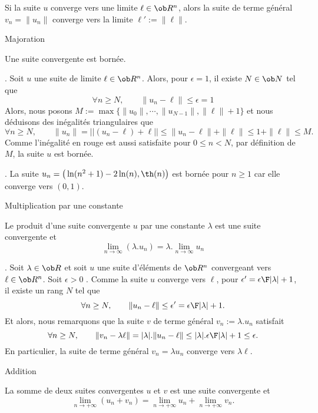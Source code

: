 Si la suite $u$ converge vers une limite $\ell\in\ob R^n$, alors la suite de terme g\'en\'eral $v_n=\|u_n\|$ converge vers la limite $\ell':=\|\ell\|$. 


\Concept [Index=Suites!limites!majoration] Majoration

\Propriete 
Une suite convergente est born\'ee. 

\Demonstration. Soit $u$ une suite de limite $\ell\in\ob R^n$. Alors, pour $\epsilon=1$, il existe $N\in\ob N$ tel que 
$$
\forall n\ge N, \qquad \|u_n-\ell\|\le \epsilon=1
$$
Alors, nous posons $M:=\max\{\|u_0\|,\cdots, \|u_{N-1}\|, \|\ell\|+1\}$ et nous d\'eduisons des in\'egalit\'es triangulaires que 
$$
 \forall n\ge N , \qquad {\|u_n\|}=\big|\big|(u_n-\ell)+\ell\big|\big|\le \|u_n-\ell\|+\|\ell\|\le 1+\|\ell\|{\le M}. 
$$
Comme l'in\'egalit\'e en rouge est aussi satisfaite pour $0\le n<N$, par d\'efinition de $M$, la suite $u$ est born\'ee. 
\CQFD

\Exemple. La suite $u_n= \big(\ln(n^2+1)-2\ln(n), \th(n)\big)$ est born\'ee pour $n\ge1$ car elle converge vers $(0, 1)$. 


\Concept [Index=Suites!limites!produit par un scalaire] Multiplication par une constante

Le produit d'une suite convergente $u$ par une constante $\lambda$ est une suite convergente et 
$$
\lim_{n\to\infty}(\lambda.u_n)=\lambda.\lim_{n\to\infty}u_n
$$

\Demonstration. Soit $\lambda\in\ob R$ et soit $u$ une suite d'\'el\'ements de $\ob R^n$ convergeant vers $\ell\in\ob R^n$. 
\pn
Soit $\epsilon>0$ . Comme la suite $u$ converge vers $\ell$, pour $\epsilon'={\epsilon\F|\lambda|+1}$,  il existe un
rang $N$ tel que $$ \forall n\ge N, \qquad \|u_n-\ell\|\le \epsilon'={\epsilon\F |\lambda|+1}.  $$ Et alors, nous remarquons
que la suite $v$ de terme g\'en\'eral $v_n:=\lambda.u_n$ satisfait $$  \forall n\ge N,  \qquad  \|v_n-
\lambda\ell\|=|\lambda|.\|u_n-\ell\|\le |\lambda|.{\epsilon\F|\lambda|+1} \le\epsilon . $$ En particulier, la suite de
terme g\'en\'eral $v_n=\lambda u_n$ converge vers $\lambda\ell$.  \CQFD

\Concept [Index=Suites!limites!addition] Addition

La somme de deux suites convergentes $u$ et $v$ est une suite convergente et 
$$
\lim_{n\to+\infty}(u_n+v_n)=\lim_{n\to+\infty}u_n+\lim_{n\to+\infty}v_n.
$$

